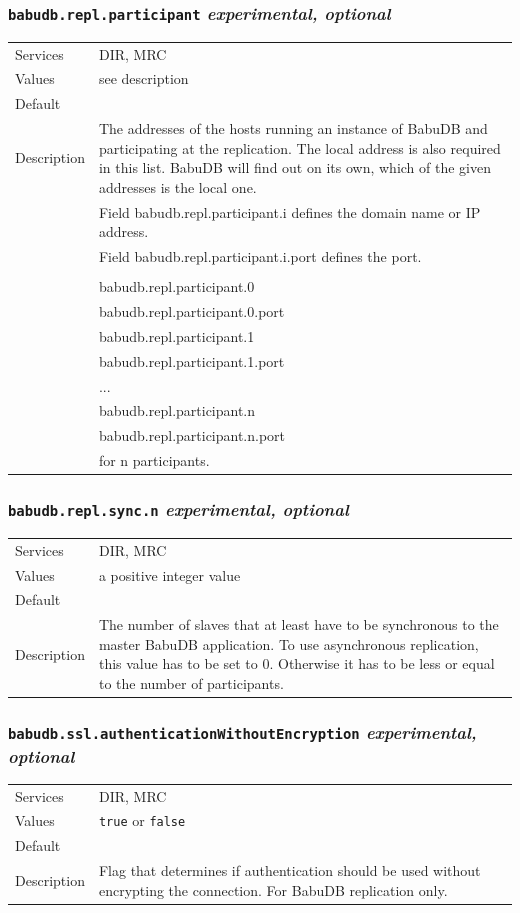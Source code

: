 \documentclass[a4paper,10pt]{book}
\begin{document}
\subsubsection{\texttt{babudb.repl.participant} \textit{experimental, optional}}
\begin{tabular}{lp{10cm}}
 Services & DIR, MRC\\
 Values   & see description\\
 Default  & \\
 Description & The addresses of the hosts running an instance of BabuDB and participating at the replication. The local address is also required in this list. BabuDB will find out on its own, which of the given addresses is the local one.\\
& Field babudb.repl.participant.i defines the domain name or IP address.\\
& Field babudb.repl.participant.i.port defines the port.\\
& \\
& babudb.repl.participant.0 \\
& babudb.repl.participant.0.port \\
& babudb.repl.participant.1 \\
& babudb.repl.participant.1.port \\
& ... \\
& babudb.repl.participant.n \\
& babudb.repl.participant.n.port \\
& for n participants. \\
\end{tabular} 

\subsubsection{\texttt{babudb.repl.sync.n} \textit{experimental, optional}}
\begin{tabular}{lp{10cm}}
 Services & DIR, MRC\\
 Values   & a positive integer value\\
 Default  & \\
 Description & The number of slaves that at least have to be synchronous to the master BabuDB application. To use asynchronous replication, this value has to be set to 0. Otherwise it has to be less or equal to the number of participants. 
\end{tabular}

\subsubsection{\texttt{babudb.ssl.authenticationWithoutEncryption} \textit{experimental, optional}}
\begin{tabular}{lp{10cm}}
 Services & DIR, MRC\\
 Values   & \texttt{true} or \texttt{false}\\
 Default  & \\
 Description & Flag that determines if authentication should be used without encrypting the connection. For BabuDB replication only.
\end{tabular}
\end{document}
